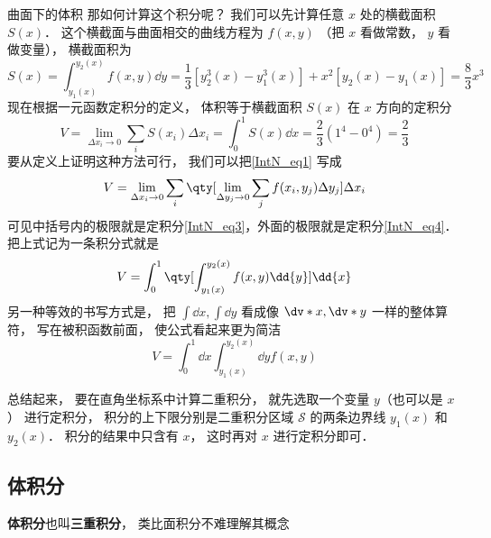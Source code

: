 \begin{exam}{曲面下的体积}
那如何计算这个积分呢？ 我们可以先计算任意 $x$ 处的横截面积 $S(x)$． 这个横截面与曲面相交的曲线方程为 $f(x,y)$ （把 $x$ 看做常数， $y$ 看做变量）， 横截面积为
\begin{equation}\label{IntN_eq3}
S(x) = \int_{y_1(x)}^{y_2(x)} f(x,y) \dd{y} = \frac 13 [y_2^3(x) - y_1^3(x)] + x^2[y_2(x) - y_1(x)] = \frac 83 x^3
\end{equation}
现在根据一元函数定积分的定义， 体积等于横截面积 $S(x)$ 在 $x$ 方向的定积分
\begin{equation}\label{IntN_eq4}
V = \lim_{\Delta x_i\to 0} \sum_{i} S(x_i) \Delta x_i = \int_0^1 S(x) \dd{x} = \frac 23 (1^4 -0^4) = \frac 23
\end{equation}
要从定义上证明这种方法可行， 我们可以把\autoref{IntN_eq1} 写成
\begin{equation}\label{}
V = \lim_{\Delta x_i\to 0} \sum_{i} \qty[\lim_{\Delta y_j\to 0}\sum_{j} f(x_i,y_j) \Delta y_j ] \Delta x_i
\end{equation}
可见中括号内的极限就是定积分\autoref{IntN_eq3}，外面的极限就是定积分\autoref{IntN_eq4}． 把上式记为一条积分式就是
\begin{equation}
V = \int_0^1 \qty[\int_{y_1(x)}^{y_2(x)} f(x,y) \dd{y}] \dd{x}
\end{equation}
另一种等效的书写方式是， 把 $\int \dd{x}, \int \dd{y}$ 看成像 $\dv*{x}, \dv*{y}$ 一样的整体算符， 写在被积函数前面， 使公式看起来更为简洁
\begin{equation}
V = \int_0^1 \dd{x} \int_{y_1(x)}^{y_2(x)} \dd{y} f(x,y)
\end{equation}
\end{exam}

总结起来， 要在直角坐标系中计算二重积分， 就先选取一个变量 $y$（也可以是 $x$） 进行定积分， 积分的上下限分别是二重积分区域 $\mathcal{S}$ 的两条边界线 $y_1(x)$ 和 $y_2(x)$． 积分的结果中只含有 $x$， 这时再对 $x$ 进行定积分即可．

\subsection{体积分}
\textbf{体积分}也叫\textbf{三重积分}， 类比面积分不难理解其概念

